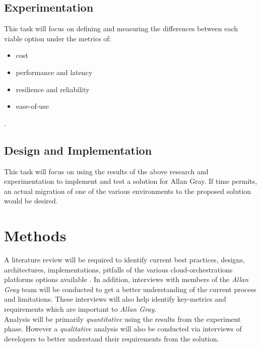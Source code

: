 \documentclass[12pt]{article}
\begin{document}
\subsection{Experimentation}
This task will focus on defining and measuring the differences between each viable option under the metrics of:
\begin{itemize}
    \item cost
    \item performance and latency 
    \item resilience and reliability 
    \item ease-of-use
\end{itemize}.
\subsection{Design and Implementation}
This task will focus on using the results of the above research and experimentation to implement and test a solution for Allan Gray. If time permits, an actual migration of one of the various environments to the proposed solution would be desired. 

\section{Methods}
A literature review will be required to identify current best practices, designs, architectures, implementations, pitfalls of the various cloud-orchestrations platforms options available . 
In addition, interviews with members of the \textit{Allan Gray} team will be conducted to get a better understanding of the current process and limitations. These interviews will also help identify key-metrics and requirements which are important to \textit{Allan Gray}. \\

\noindent Analysis will be primarily \textit{quantitative} using the results from the experiment phase. However a \textit{qualitative} analysis will also be conducted via interviews of developers to better understand their requirements from the solution.
\end{document}
